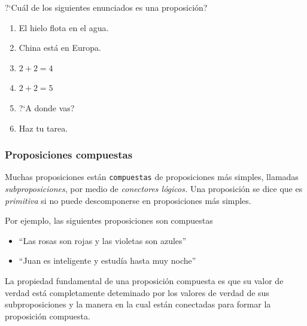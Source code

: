 \documentclass[xcolor={svgnames},
  hyperref={colorlinks}, 
  spanish, 12pt]{beamer}
\numberwithin{equation}{section} %
\numberwithin{figure}{section} %
\begin{document}
\begin{frame}
    \begin{exmp}
        ?`Cu\'al de los siguientes enunciados es una proposici\'on?
        \begin{multicols}{2}
            \begin{enumerate}
                \item El hielo flota en el agua.
                \item China est\'a en Europa.
                \item $2+2=4$
                \item $2+2=5$
                \item ?`A donde vas?
                \item Haz tu tarea.
            \end{enumerate}
        \end{multicols}
    \end{exmp}
    
\end{frame}

\subsubsection{Proposiciones compuestas}

\begin{frame}
    Muchas proposiciones est\'an \texttt{compuestas} de proposiciones m\'as simples, llamadas \emph{subproposiciones}, por medio de \emph{conectores l\'ogicos.} \pause Una proposici\'on se dice que es \emph{primitiva} si no puede descomponerse en proposiciones m\'as simples.
\end{frame}

\begin{frame}
    Por ejemplo, las siguientes proposiciones son compuestas
    \begin{itemize}
        \item ``Las rosas son rojas y las violetas son azules''
        \item ``Juan es inteligente y estud\'ia hasta muy noche''
    \end{itemize}
    
\end{frame}

\begin{frame}
    La propiedad fundamental de una proposici\'on compuesta es que su valor de verdad est\'a completamente deteminado por los valores de verdad de sus subproposiciones y la manera en la cual est\'an conectadas para formar la proposici\'on compuesta. 
\end{frame}
\end{document}
